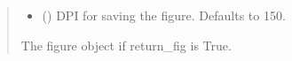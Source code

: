 \documentclass[letterpaper,10pt,english]{sphinxmanual}
\begin{document}
\begin{fulllineitems}
\begin{quote}
\begin{description}
\begin{itemize}
\item {} 
\sphinxAtStartPar
{} (\sphinxstyleliteralemphasis{\sphinxupquote{, }}) \textendash{} DPI for saving the figure. Defaults to 150.

\end{itemize}

\sphinxAtStartPar
{} \textendash{} The figure object if return\_fig is True.

\end{description}\end{quote}

\end{fulllineitems}

\end{document}
